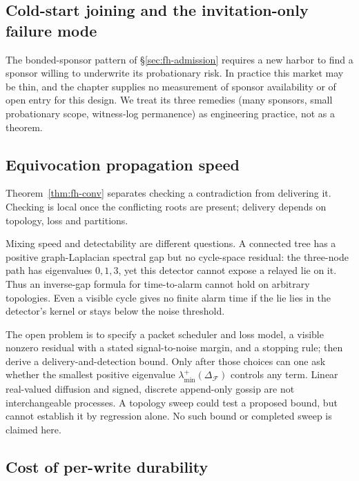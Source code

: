 \documentclass[11pt,a4paper]{article}
\theoremstyle{definition}
\theoremstyle{remark}
\begin{document}
\subsection{Cold-start joining and the invitation-only failure mode}\label{sec:fh-lim-cold-start}

The bonded-sponsor pattern of \S\ref{sec:fh-admission} requires a new harbor to find a sponsor willing to underwrite its probationary risk. In practice this market may be thin, and the chapter supplies no measurement of sponsor availability or
of open entry for this design. We treat its three remedies (many sponsors, small probationary scope, witness-log permanence) as engineering practice, not as a theorem.

\subsection{Equivocation propagation speed}\label{sec:fh-lim-equiv}

Theorem~\ref{thm:fh-conv} separates checking a contradiction from delivering it.
Checking is local once the conflicting roots are present; delivery depends on
topology, loss and partitions.

\pdtreecounterexample
Mixing speed and detectability are different questions. A connected tree has a
positive graph-Laplacian spectral gap but no cycle-space residual: the three-node
path has eigenvalues $0,1,3$, yet this detector cannot expose a relayed lie on it.
Thus an inverse-gap formula for time-to-alarm cannot hold on arbitrary topologies.
Even a visible cycle gives no finite alarm time if the lie lies in the detector's
kernel or stays below the noise threshold.

The open problem is to specify a packet scheduler and loss model, a visible
nonzero residual with a stated signal-to-noise margin, and a stopping rule;
then derive a delivery-and-detection bound. Only after those choices can one ask
whether the smallest positive eigenvalue $\lambda_{\min}^{+}
(\Delta_{\mathcal F})$ controls any term. Linear real-valued diffusion and
signed, discrete append-only gossip are not interchangeable processes.
A topology sweep could test a proposed bound, but cannot establish it by
regression alone. No such bound or completed sweep is claimed here.

\subsection{Cost of per-write durability}\label{sec:fh-lim-overhead}
\end{document}
